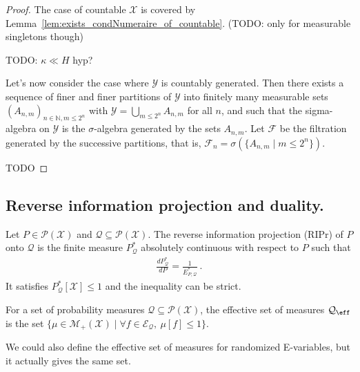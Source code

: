\begin{proof}
The case of countable $\mathcal{X}$ is covered by Lemma~\ref{lem:exists_condNumeraire_of_countable}. (TODO: only for measurable singletons though)

TODO: $\kappa \ll H$ hyp?

Let's now consider the case where $\mathcal{Y}$ is countably generated.
Then there exists a sequence of finer and finer partitions of $\mathcal{Y}$ into finitely many measurable sets $(A_{n,m})_{n \in \mathbb{N}, m \le 2^n}$ with $\mathcal{Y} = \bigcup_{m \le 2^n} A_{n,m}$ for all $n$, and such that the sigma-algebra on $\mathcal{Y}$ is the $\sigma$-algebra generated by the sets $A_{n,m}$.
Let $\mathcal{F}$ be the filtration generated by the successive partitions, that is, $\mathcal{F}_n = \sigma(\{A_{n,m} \mid m \le 2^n\})$.

TODO
\end{proof}




\subsection{Reverse information projection and duality.}

\begin{definition}\label{def:ripr}
Let $P \in \mathcal{P}(\mathcal{X})$ and $\mathcal{Q} \subseteq \mathcal{P}(\mathcal{X})$.
The reverse information projection (RIPr) of $P$ onto $\mathcal{Q}$ is the finite measure $P^*_{\mathcal{Q}}$ absolutely continuous with respect to $P$ such that
\begin{align*}
  \frac{dP^*_{\mathcal{Q}}}{dP} = \frac{1}{E^*_{P, \mathcal{Q}}} \: .
\end{align*}
It satisfies $P^*_{\mathcal{Q}}[\mathcal{X}] \le 1$ and the inequality can be strict.
\end{definition}


\begin{definition}\label{def:effectiveSet}
For a set of probability measures $\mathcal{Q} \subseteq \mathcal{P}(\mathcal{X})$, the effective set of measures $\mathcal{Q}_{\eff}$ is the set $\{\mu \in \mathcal{M}_+(\mathcal{X}) \mid \forall f \in \mathcal{E}_{\mathcal{Q}}, \: \mu[f] \le 1\}$.
\end{definition}

We could also define the effective set of measures for randomized E-variables, but it actually gives the same set.


